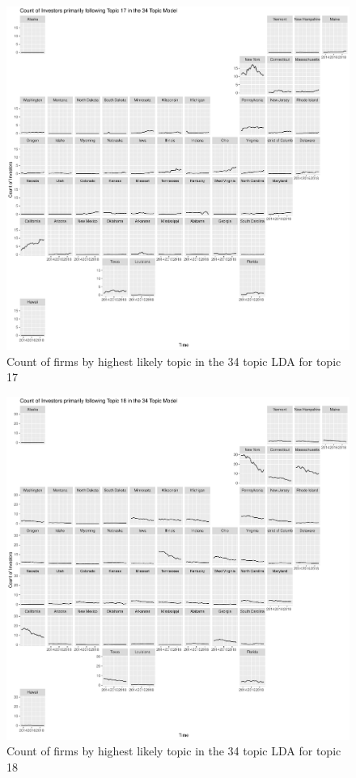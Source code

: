 		\begin{figure}
		\centering
		\includegraphics[width=1\linewidth]{Figures/ChapterV/USA_34_Topic17.pdf}
		\caption[Count of Firms for Topic 17 by Quarter]{Count of firms by highest likely topic in the 34 topic LDA for topic 17}
		\label{fig:StateLDA17}
	\end{figure}
	
		\begin{figure}
		\centering
		\includegraphics[width=1\linewidth]{Figures/ChapterV/USA_34_Topic18.pdf}
		\caption[Count of Firms for Topic 18 by Quarter]{Count of firms by highest likely topic in the 34 topic LDA for topic 18}
		\label{fig:StateLDA18}
	\end{figure}
	
